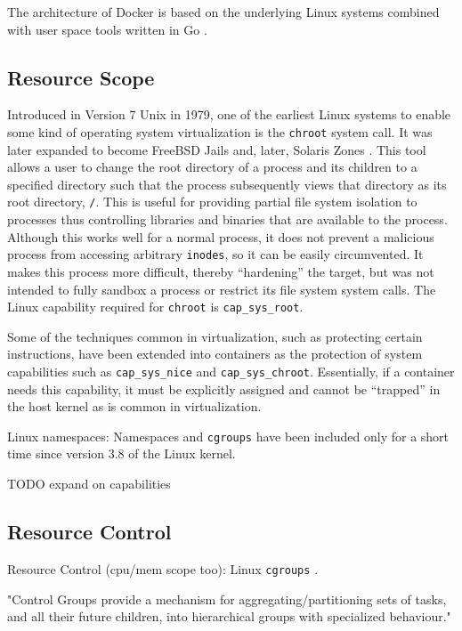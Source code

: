 The architecture of Docker is based on the underlying Linux systems combined with user space tools written in Go \autocite{dockerarch1}. 

\subsection{Resource Scope}
\label{sec:resource_scope}

Introduced in Version 7 Unix in 1979, one of the earliest Linux systems to enable some kind of operating system virtualization is the \texttt{chroot} system call.
It was later expanded to become FreeBSD Jails and, later, Solaris Zones \autocite{_zones_1}.  
This tool allows a user to change the root directory of a process and its children to a specified directory such that the process subsequently views that directory as its root directory, \texttt{/}.  
This is useful for providing partial file system isolation to processes thus controlling libraries and binaries that are available to the process.
Although this works well for a normal process, it does not prevent a malicious process from accessing arbitrary \texttt{inodes}, so it can be easily circumvented.
It makes this process more difficult, thereby ``hardening'' the target, but was not intended to fully sandbox a process or restrict its file system system calls.
The Linux capability required for \texttt{chroot} is \texttt{cap\_sys\_root}. 

Some of the techniques common in virtualization, such as protecting certain instructions, have been extended into containers as the protection of system capabilities such as \texttt{cap\_sys\_nice} and \texttt{cap\_sys\_chroot}.  
Essentially, if a container needs this capability, it must be explicitly assigned and cannot be ``trapped'' in the host kernel as is common in virtualization.

Linux namespaces: Namespaces and \texttt{cgroups} have been included only for a short time since version 3.8 of the Linux kernel.  

TODO expand on capabilities


\subsection{Resource Control}
\label{sec:resource_control}
Resource Control (cpu/mem scope too): 
Linux \texttt{cgroups} \autocite{kernelcgroups}.

"Control Groups provide a mechanism for aggregating/partitioning sets of tasks, and all their future children, into hierarchical groups with specialized behaviour."

